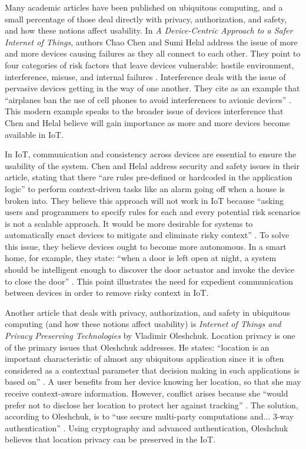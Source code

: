 \documentclass[11pt, oneside]{article}   	%
\begin{document}
Many academic articles have been published on ubiquitous computing, and a small percentage of those deal directly with privacy, authorization, and safety, and how these notions affect usability. In \textit{A Device-Centric Approach to a Safer Internet of Things}, authors Chao Chen and Sumi Helal address the issue of more and more devices causing failures as they all connect to each other. They point to four categories of risk factors that leave devices vulnerable: hostile environment, interference, misuse, and internal failures \cite{chenandhelal}. Interference deals with the issue of pervasive devices getting in the way of one another. They cite as an example that ``airplanes ban the use of cell phones to avoid interferences to avionic devices'' \cite{chenandhelal}. This modern example speaks to the broader issue of devices interference that Chen and Helal believe will gain importance as more and more devices become available in IoT.

In IoT, communication and consistency across devices are essential to ensure the usability of the system. Chen and Helal address security and safety issues in their article, stating that there ``are rules pre-defined or hardcoded in the application logic'' to perform context-driven tasks like an alarm going off when a house is broken into. They believe this approach will not work in IoT because ``asking users and programmers to specify rules for each and every potential risk scenarios is not a scalable approach. It would be more desirable for systems to automatically enact devices to mitigate and eliminate risky context'' \cite{chenandhelal}. To solve this issue, they believe devices ought to become more autonomous. In a smart home, for example, they state: ``when a door is left open at night, a system should be intelligent enough to discover the door actuator and invoke the device to close the door'' \cite{chenandhelal}. This point illustrates the need for expedient communication between devices in order to remove risky context in IoT.

Another article that deals with privacy, authorization, and safety in ubiquitous computing (and how these notions affect usability) is \textit{Internet of Things and Privacy Preserving Technologies} by Vladimir Oleshchuk. Location privacy is one of the primary issues that Oleshchuk addresses. He states: ``location is an important characteristic of almost any ubiquitous application since it is often considered as a contextual parameter that decision making in such applications is based on'' \cite{oleshchuk}. A user benefits from her device knowing her location, so that she may receive context-aware information. However, conflict arises because she ``would prefer not to disclose her location to protect her against tracking'' \cite{oleshchuk}. The solution, according to Oleshchuk, is to ``use secure multi-party computations and... 3-way authentication'' \cite{oleshchuk}. Using cryptography and advanced authentication, Oleshchuk believes that location privacy can be preserved in the IoT.
\end{document}
